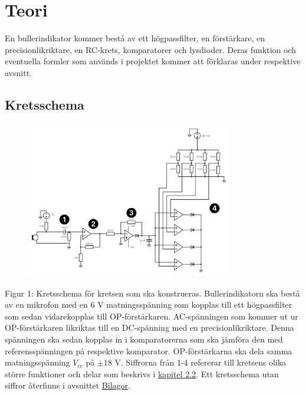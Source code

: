 \documentclass[12pt]{report}
\begin{document}
\chapter{Teori}
\label{chap:teori}
En bullerindikator kommer bestå av ett högpassfilter, en förstärkare, en precisionlikriktare, en RC-krets, komparatorer och lysdioder. Deras funktion och eventuella formler som används i projektet kommer att förklaras under respektive avsnitt.

\section{Kretsschema}
\label{sec:circ}

\begin{figure}[ht]
  \centering
  \includegraphics[width=0.8\textwidth]{bilder/circuit-numbered.png}
  \label{fig:circuit}
\end{figure}

\noindent Figur 1: Kretsschema för kretsen som ska konstrueras. Bullerindikatorn ska bestå av en mikrofon med en 6 V matningsspänning som kopplas till ett högpassfilter som sedan vidarekopplas till OP-förstärkaren. AC-spänningen som kommer ut ur OP-förstärkaren likriktas till en DC-spänning med en precisionlikriktare. Denna spänningen ska sedan kopplas in i komparatorerna som ska jämföra den med referensspänningen på respektive komparator. OP-förstärkarna ska dela samma matningsspänning $V_{cc}$ på $\pm18$ V. Siffrorna från 1-4 refererar till kretsens olika större funktioner och delar som beskrivs i \hyperref[sec:parts]{kapitel 2.2}. Ett kretsschema utan siffror återfinns i avsnittet \hyperref[chap:bilagor]{Bilagor}.

\end{document}
